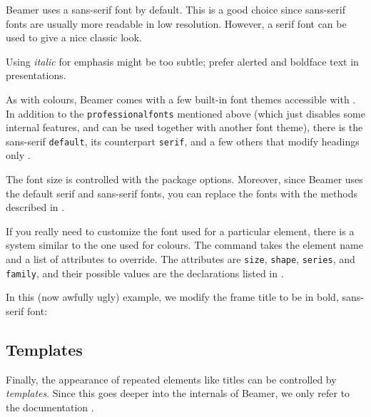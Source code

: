 \begin{practices}
Beamer uses a sans-serif font by default.
This is a good choice since sans-serif fonts are usually more readable in low resolution.
However, a serif font can be used to give a nice classic look.

Using \emph{italic} for emphasis might be too subtle;
prefer alerted and boldface text in presentations.
\end{practices}

As with colours, Beamer comes with a few built-in font themes
accessible with .
In addition to the \verb|professionalfonts| mentioned above
(which just disables some internal features, and can be used together with another font theme),
there is the sans-serif \verb|default|, its counterpart \verb|serif|,
and a few others that modify headings only \cite[Section~18.1]{beamer}.

The font size is controlled with the package options.
Moreover, since Beamer uses the default serif and sans-serif fonts,
you can replace the fonts with the methods described in .

If you really need to customize the font used for a particular element,
there is a system similar to the one used for colours.
The  command takes the element name and a list of attributes to override.
The attributes are \verb|size|, \verb|shape|, \verb|series|, and \verb|family|,
and their possible values are the declarations listed in .

In this (now awfully ugly) example,
we modify the frame title to be in bold, sans-serif font:
\begin{ExampleCode}
\end{ExampleCode}
%
\begin{center}
\end{center}



%
%
\subsection{Templates}

Finally, the appearance of repeated elements like titles can be controlled by \emph{templates}.
Since this goes deeper into the internals of Beamer,
we only refer to the documentation \cite[Section~16.3]{beamer}.


